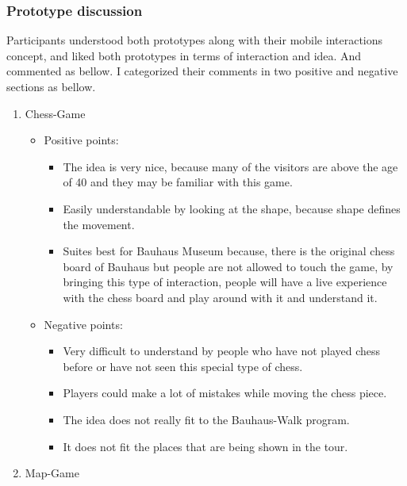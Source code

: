 \subsubsection{Prototype discussion}
Participants understood both prototypes along with their mobile interactions concept, and liked both prototypes in terms of interaction and idea. And commented as bellow. I categorized their comments in two positive and negative sections as bellow.
\begin {enumerate}

\item Chess-Game

\begin {itemize}

\item{Positive points:} 

\begin {itemize}
\item	The idea is very nice, because many of the visitors are above the age of 40 and they may be familiar with this game.
\item	Easily understandable by looking at the shape, because shape defines the movement. 
\item	Suites best for Bauhaus Museum because, there is the original chess board of Bauhaus but people are not allowed to touch the game, by bringing this type of interaction, people will have a live experience with the chess board and play around with it and understand it.

\end {itemize}

\item{Negative points:} \
\begin {itemize}
\item	Very difficult to understand by people who have not played chess before or have not seen this special type of chess.
\item	Players could make a lot of mistakes while moving the chess piece. 
\item	The idea does not really fit to the Bauhaus-Walk program.
\item	It does not fit the places that are being shown in the tour.
\end {itemize}
\end {itemize}

\item Map-Game 

\begin {itemize}


\end{itemize}
\end{enumerate}
